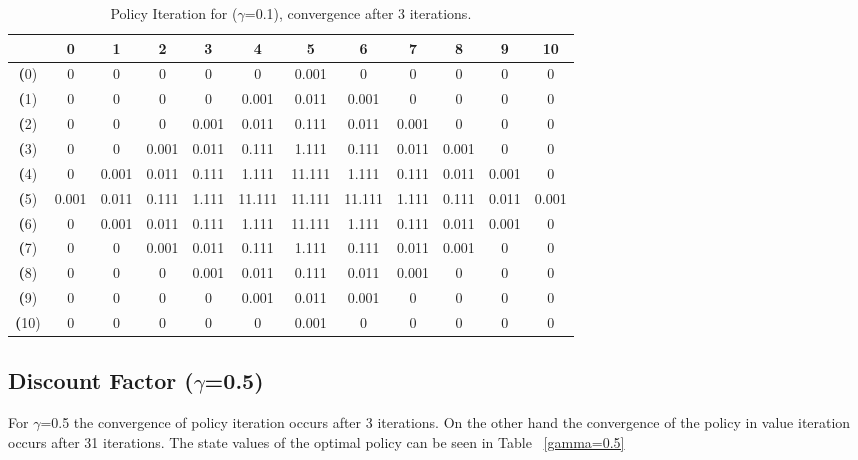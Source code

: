 \documentclass[11pt]{article}
\begin{document}
\begin{center}
\begin{table*}[ht]
{\small
\hfill{}
\begin{tabular}{c|c|c|c|c|c|c|c|c|c|c|c}
\textbf{} & \textbf{0} & \textbf{1} & \textbf{2} & \textbf{3} & \textbf{4} & \textbf{5} & \textbf{6} & \textbf{7} & \textbf{8} & \textbf{9} & \textbf{10}\\
	\hline

\textbf(0)& 0	& 0	& 0	& 0	& 0	& 0.001	& 0	& 0	& 0	& 0	& 0	\\
\textbf(1)& 0	& 0	& 0	& 0	& 0.001	& 0.011	& 0.001	& 0	& 0	& 0	& 0	\\
\textbf(2)& 0	& 0	& 0	& 0.001	& 0.011	& 0.111	& 0.011	& 0.001	& 0	& 0	& 0	\\
\textbf(3)& 0	& 0	& 0.001	& 0.011	& 0.111	& 1.111	& 0.111	& 0.011	& 0.001	& 0	& 0	\\
\textbf(4)& 0	& 0.001	& 0.011	& 0.111	& 1.111	& 11.111	& 1.111	& 0.111	& 0.011	& 0.001	& 0	\\
\textbf(5)& 0.001	& 0.011	& 0.111	& 1.111	& 11.111	& 11.111	& 11.111	& 1.111	& 0.111	& 0.011	& 0.001	\\
\textbf(6)& 0	& 0.001	& 0.011	& 0.111	& 1.111	& 11.111	& 1.111	& 0.111	& 0.011	& 0.001	& 0	\\
\textbf(7)& 0	& 0	& 0.001	& 0.011	& 0.111	& 1.111	& 0.111	& 0.011	& 0.001	& 0	& 0	\\
\textbf(8)& 0	& 0	& 0	& 0.001	& 0.011	& 0.111	& 0.011	& 0.001	& 0	& 0	& 0	\\
\textbf(9)& 0	& 0	& 0	& 0	& 0.001	& 0.011	& 0.001	& 0	& 0	& 0	& 0	\\
\textbf(10)& 0	& 0	& 0	& 0	& 0	& 0.001	& 0	& 0	& 0	& 0	& 0	\\

\end{tabular}}
\hfill{}
\caption{Policy Iteration for ($\gamma$=0.1), convergence after 3 iterations.}
\label{table:gamma=0.1}
\end{table*}
\end{center}	

\subsection{Discount Factor ($\gamma$=0.5)}

For $\gamma$=0.5 the convergence of policy iteration occurs after 3 iterations. On the other hand the convergence of the policy in value iteration occurs after 31 iterations. The state values of the optimal policy can be seen in Table ~\ref{gamma=0.5}
\end{document}
